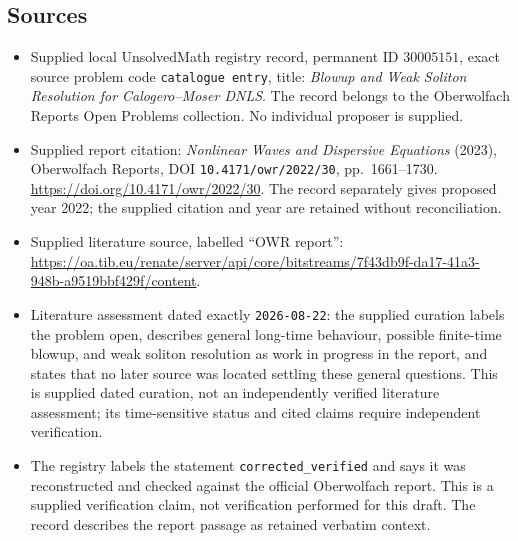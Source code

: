 \documentclass[11pt]{article}
\begin{document}
\subsection{Sources}
\begin{itemize}
\item Supplied local UnsolvedMath registry record, permanent ID \(30005151\), exact source problem code \texttt{catalogue entry}, title: \emph{Blowup and Weak Soliton Resolution for Calogero--Moser DNLS}. The record belongs to the Oberwolfach Reports Open Problems collection. No individual proposer is supplied.
\item Supplied report citation: \emph{Nonlinear Waves and Dispersive Equations} (2023), Oberwolfach Reports, DOI \texttt{10.4171/owr/2022/30}, pp.\ 1661--1730. \url{https://doi.org/10.4171/owr/2022/30}. The record separately gives proposed year 2022; the supplied citation and year are retained without reconciliation.
\item Supplied literature source, labelled ``OWR report'': \url{https://oa.tib.eu/renate/server/api/core/bitstreams/7f43db9f-da17-41a3-948b-a9519bbf429f/content}.
\item Literature assessment dated exactly \texttt{2026-08-22}: the supplied curation labels the problem open, describes general long-time behaviour, possible finite-time blowup, and weak soliton resolution as work in progress in the report, and states that no later source was located settling these general questions. This is supplied dated curation, not an independently verified literature assessment; its time-sensitive status and cited claims require independent verification.
\item The registry labels the statement \texttt{corrected\_verified} and says it was reconstructed and checked against the official Oberwolfach report. This is a supplied verification claim, not verification performed for this draft. The record describes the report passage as retained verbatim context.
\end{itemize}
\end{document}
